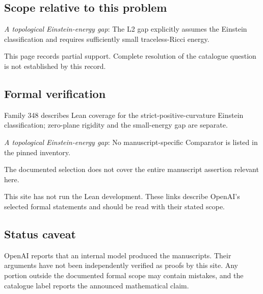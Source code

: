 \documentclass[11pt]{article}
\begin{document}
\subsection{Scope relative to this problem}
\textit{A topological Einstein-energy gap}: The L2 gap explicitly assumes the Einstein classification and requires sufficiently small traceless-Ricci energy.

This page records partial support. Complete resolution of the catalogue question is not established by this record.

\subsection{Formal verification}
Family 348 describes Lean coverage for the strict-positive-curvature Einstein classification; zero-plane rigidity and the small-energy gap are separate.

\textit{A topological Einstein-energy gap}: No manuscript-specific Comparator is listed in the pinned inventory.

The documented selection does not cover the entire manuscript assertion relevant here.

This site has not run the Lean development. These links describe OpenAI’s selected formal statements and should be read with their stated scope.

\subsection{Status caveat}
OpenAI reports that an internal model produced the manuscripts. Their arguments have not been independently verified as proofs by this site. Any portion outside the documented formal scope may contain mistakes, and the catalogue label reports the announced mathematical claim.
\end{document}
